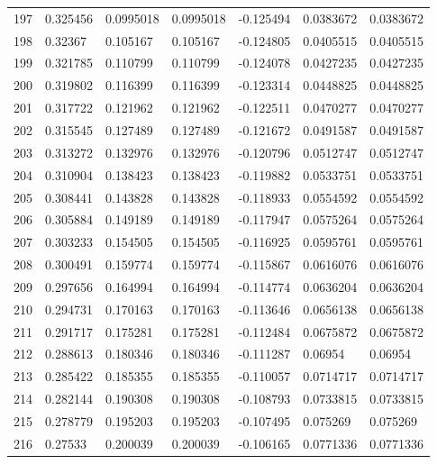 \begin{longtable}{l|lll|lll}
 197 &  0.325456    & 0.0995018   & 0.0995018   & -0.125494    & 0.0383672   & 0.0383672   \\
 198 &  0.32367     & 0.105167    & 0.105167    & -0.124805    & 0.0405515   & 0.0405515   \\
 199 &  0.321785    & 0.110799    & 0.110799    & -0.124078    & 0.0427235   & 0.0427235   \\
 200 &  0.319802    & 0.116399    & 0.116399    & -0.123314    & 0.0448825   & 0.0448825   \\
 201 &  0.317722    & 0.121962    & 0.121962    & -0.122511    & 0.0470277   & 0.0470277   \\
 202 &  0.315545    & 0.127489    & 0.127489    & -0.121672    & 0.0491587   & 0.0491587   \\
 203 &  0.313272    & 0.132976    & 0.132976    & -0.120796    & 0.0512747   & 0.0512747   \\
 204 &  0.310904    & 0.138423    & 0.138423    & -0.119882    & 0.0533751   & 0.0533751   \\
 205 &  0.308441    & 0.143828    & 0.143828    & -0.118933    & 0.0554592   & 0.0554592   \\
 206 &  0.305884    & 0.149189    & 0.149189    & -0.117947    & 0.0575264   & 0.0575264   \\
 207 &  0.303233    & 0.154505    & 0.154505    & -0.116925    & 0.0595761   & 0.0595761   \\
 208 &  0.300491    & 0.159774    & 0.159774    & -0.115867    & 0.0616076   & 0.0616076   \\
 209 &  0.297656    & 0.164994    & 0.164994    & -0.114774    & 0.0636204   & 0.0636204   \\
 210 &  0.294731    & 0.170163    & 0.170163    & -0.113646    & 0.0656138   & 0.0656138   \\
 211 &  0.291717    & 0.175281    & 0.175281    & -0.112484    & 0.0675872   & 0.0675872   \\
 212 &  0.288613    & 0.180346    & 0.180346    & -0.111287    & 0.06954     & 0.06954     \\
 213 &  0.285422    & 0.185355    & 0.185355    & -0.110057    & 0.0714717   & 0.0714717   \\
 214 &  0.282144    & 0.190308    & 0.190308    & -0.108793    & 0.0733815   & 0.0733815   \\
 215 &  0.278779    & 0.195203    & 0.195203    & -0.107495    & 0.075269    & 0.075269    \\
 216 &  0.27533     & 0.200039    & 0.200039    & -0.106165    & 0.0771336   & 0.0771336   \\

\end{longtable}

